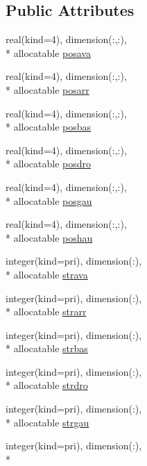 \subsection*{Public Attributes}
\begin{DoxyCompactItemize}
\item 
real(kind=4), dimension(\-:,\-:), \\*
allocatable \hyperlink{classmodfofmpi_a91f992ee7447a7fb3c5430233f3f39ab}{posava}
\item 
real(kind=4), dimension(\-:,\-:), \\*
allocatable \hyperlink{classmodfofmpi_a240c326e64798f0d4f7fd2a785eaddfb}{posarr}
\item 
real(kind=4), dimension(\-:,\-:), \\*
allocatable \hyperlink{classmodfofmpi_abd8afe0852ff1d0298955d285cb4f001}{posbas}
\item 
real(kind=4), dimension(\-:,\-:), \\*
allocatable \hyperlink{classmodfofmpi_a1ca3754d2490a28a6596589818c19aba}{posdro}
\item 
real(kind=4), dimension(\-:,\-:), \\*
allocatable \hyperlink{classmodfofmpi_a420a314f84492aec68a773c09730981d}{posgau}
\item 
real(kind=4), dimension(\-:,\-:), \\*
allocatable \hyperlink{classmodfofmpi_a940b15087397a154e933785ff862d1aa}{poshau}
\item 
integer(kind=pri), dimension(\-:), \\*
allocatable \hyperlink{classmodfofmpi_a2cc07767e1b2a2462fc2eeaaef5f5b0a}{strava}
\item 
integer(kind=pri), dimension(\-:), \\*
allocatable \hyperlink{classmodfofmpi_adc11b8c24e402c222ddf9d339aece63c}{strarr}
\item 
integer(kind=pri), dimension(\-:), \\*
allocatable \hyperlink{classmodfofmpi_a18f63a61d3cf10a560030f18385646d6}{strbas}
\item 
integer(kind=pri), dimension(\-:), \\*
allocatable \hyperlink{classmodfofmpi_a6f52fb3f19368ce1dbad562162f6d4b5}{strdro}
\item 
integer(kind=pri), dimension(\-:), \\*
allocatable \hyperlink{classmodfofmpi_a59d3a040e03ea0312701cf16ded04071}{strgau}
\item 
integer(kind=pri), dimension(\-:), \\*

\end{DoxyCompactItemize}

